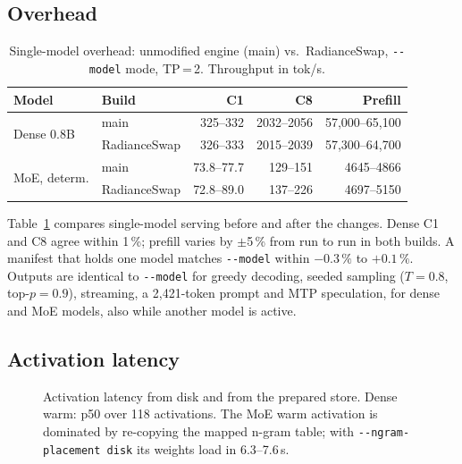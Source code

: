\documentclass[10pt,conference,a4paper]{IEEEtran}
\newcommand{\code}[1]{\texttt{#1}}
\begin{document}
\subsection{Overhead}

\begin{table}[t]
\caption{Single-model overhead: unmodified engine (main) vs.\ RadianceSwap, \code{-{}-model} mode, TP\,=\,2. Throughput in tok/s.}
\label{tab:overhead}
\centering\footnotesize
\setlength{\tabcolsep}{4pt}
\begin{tabular}{@{}llrrr@{}}
\toprule
Model & Build & C1 & C8 & Prefill \\
\midrule
\multirow{2}{*}{Dense 0.8B} & main & 325--332 & 2032--2056 & 57{,}000--65{,}100 \\
                            & RadianceSwap & 326--333 & 2015--2039 & 57{,}300--64{,}700 \\
\midrule
\multirow{2}{*}{MoE, determ.} & main & 73.8--77.7 & 129--151 & 4645--4866 \\
                              & RadianceSwap & 72.8--89.0 & 137--226 & 4697--5150 \\
\bottomrule
\end{tabular}
\end{table}

Table~\ref{tab:overhead} compares single-model serving before and after the changes. Dense C1 and
C8 agree within 1\,\%; prefill varies by $\pm$5\,\% from run to run in both builds. A manifest that
holds one model matches \code{-{}-model} within $-0.3\,\%$ to $+0.1\,\%$. Outputs are identical to
\code{-{}-model} for greedy decoding, seeded sampling ($T=0.8$, top-$p=0.9$), streaming, a 2{,}421-token
prompt and MTP speculation, for dense and MoE models, also while another model is active.

\subsection{Activation latency}

\begin{figure}[t]
\centering
{}
\caption{Activation latency from disk and from the prepared store. Dense warm: p50 over 118
activations. The MoE warm activation is dominated by re-copying the mapped n-gram table; with
\code{-{}-ngram-placement disk} its weights load in 6.3--7.6\,s.}
\label{fig:activation}
\end{figure}
\end{document}
